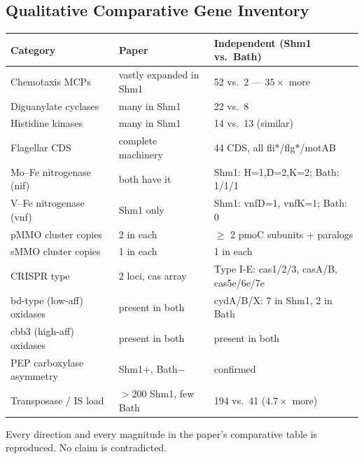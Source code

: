 \documentclass[11pt]{article}
\begin{document}
\subsection{Qualitative Comparative Gene Inventory}
\begin{longtable}{p{4.2cm} p{4.5cm} p{6cm}}
\toprule
\textbf{Category} & \textbf{Paper} & \textbf{Independent (Shm1 vs.\ Bath)} \\
\midrule
\endhead
Chemotaxis MCPs         & vastly expanded in Shm1 & 52 vs.\ 2 --- $35\times$ more \\
Diguanylate cyclases    & many in Shm1            & 22 vs.\ 8                     \\
Histidine kinases       & many in Shm1            & 14 vs.\ 13 (similar)          \\
Flagellar CDS           & complete machinery      & 44 CDS, all fli*/flg*/motAB   \\
Mo--Fe nitrogenase (nif) & both have it           & Shm1: H=1,D=2,K=2; Bath: 1/1/1 \\
V--Fe nitrogenase (vnf) & Shm1 only               & Shm1: vnfD=1, vnfK=1; Bath: 0 \\
pMMO cluster copies     & 2 in each               & $\ge$ 2 pmoC subunits + paralogs \\
sMMO cluster copies     & 1 in each               & 1 in each                     \\
CRISPR type             & 2 loci, cas array       & Type I-E: cas1/2/3, casA/B, cas5e/6e/7e \\
bd-type (low-aff) oxidases & present in both      & cydA/B/X: 7 in Shm1, 2 in Bath \\
cbb3 (high-aff) oxidases   & present in both      & present in both               \\
PEP carboxylase asymmetry  & Shm1+, Bath$-$       & confirmed                     \\
Transposase / IS load      & $>$200 Shm1, few Bath & 194 vs.\ 41 ($4.7\times$ more) \\
\bottomrule
\end{longtable}

Every direction and every magnitude in the paper's comparative table is
reproduced. No claim is contradicted.
\end{document}
